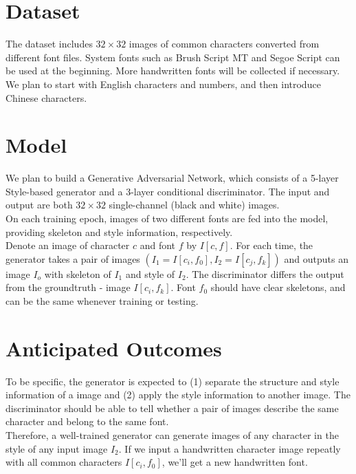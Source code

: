 \documentclass[letterpaper]{article}
\begin{document}
\section{Dataset}
The dataset includes $32 \times 32$ images of common characters converted from different font files. System fonts such as Brush Script MT and Segoe Script can be used at the beginning. More handwritten fonts will be collected if necessary. We plan to start with English characters and numbers, and then introduce Chinese characters.

\section{Model}
We plan to build a Generative Adversarial Network, which consists of a 5-layer Style-based generator and a 3-layer conditional discriminator. The input and output are both $32 \times 32$ single-channel (black and white) images.
\\
On each training epoch, images of two different fonts are fed into the model, providing skeleton and style information, respectively.
\\
Denote an image of character $c$ and font $f$ by $I[c,f]$. For each time, the generator takes a pair of images $(I_1=I[c_i,f_0], I_2=I[c_j,f_k])$ and outputs an image $I_o$ with skeleton of $I_1$ and style of $I_2$. The discriminator differs the output from the groundtruth - image $I[c_i,f_k]$. Font $f_0$ should have clear skeletons, and can be the same whenever training or testing.

\section{Anticipated Outcomes}
To be specific, the generator is expected to (1) separate the structure and style information of a image and (2) apply the style information to another image. The discriminator should be able to tell whether a pair of images describe the same character and belong to the same font.
\\
Therefore, a well-trained generator can generate images of any character in the style of any input image $I_2$. If we input a handwritten character image repeatly with all common characters $I[c_i,f_0]$, we'll get a new handwritten font.
\end{document}
